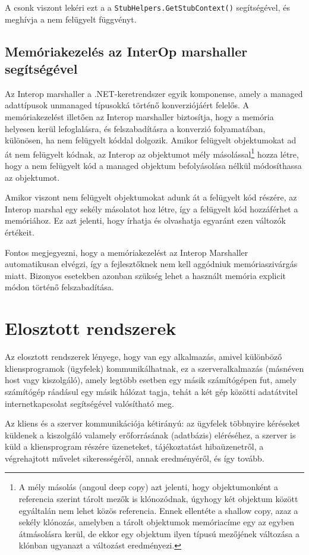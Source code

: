\documentclass[tocnopagenum]{thesis-ekf}
\theoremstyle{definition}
\theoremstyle{remark}
\begin{document}
	A csonk viszont lekéri ezt a a \verb*|StubHelpers.GetStubContext()| segítségével, és meghívja a nem felügyelt függvényt.
	\cite{pinvoke}
	\cite{interop_native}
	\section{Memóriakezelés az InterOp marshaller segítségével}
	Az Interop marshaller a .NET-keretrendszer egyik komponense, amely a managed adattípusok unmanaged típusokká történő konverziójáért felelős. A memóriakezelést illetően az Interop marshaller biztosítja, hogy a memória helyesen kerül lefoglalásra, és felszabadításra a konverzió folyamatában, különösen, ha nem felügyelt kóddal dolgozik.
	Amikor felügyelt objektumokat ad át nem felügyelt kódnak, az Interop az objektumot mély másolással\footnote{A mély másolás (angoul deep copy) azt jelenti, hogy objektumonként a referencia szerint tárolt mezők is klónozódnak, úgyhogy két objektum között egyáltalán nem lehet közös referencia. Ennek ellentéte a shallow copy, azaz a sekély klónozás, amelyben a tárolt objektumok memóriacíme egy az egyben átmásolásra kerül, de ekkor egy objektum ilyen típusú mezőjének változása a klónban ugyanazt a változást eredményezi.} hozza létre, hogy a nem felügyelt kód a managed objektum befolyásolása nélkül módosíthassa az objektumot. 
	
	Amikor viszont nem felügyelt objektumokat adunk át a felügyelt kód részére, az Interop marshal egy sekély másolatot hoz létre, így a felügyelt kód hozzáférhet a memóriához. Ez azt jelenti, hogy írhatja és olvashatja egyaránt ezen változók értékeit.
	
	Fontos megjegyezni, hogy a memóriakezelést az Interop Marshaller automatikusan elvégzi, így a fejlesztőknek nem kell aggódniuk memóriaszivárgás miatt. Bizonyos esetekben azonban szükség lehet a használt memória explicit módon történő felszabadítása.
	\cite{memhandling}
	\chapter{Elosztott rendszerek}
	Az elosztott rendszerek lényege, hogy van egy alkalmazás, amivel különböző kliensprogramok (ügyfelek) kommunikálhatnak, ez a szerveralkalmazás (másnéven host vagy kiszolgáló), amely legtöbb esetben egy másik számítógépen fut, amely számítógép ráadásul egy másik hálózat tagja, tehát a két gép közötti adatátvitel internetkapcsolat segítségével valósítható meg. 
	
	Az kliens és a szerver kommunikációja kétirányú: az ügyfelek többnyire kéréseket küldenek a kiszolgáló valamely erőforrásának (adatbázis) eléréséhez, a szerver is küld a kliensprogram részére üzeneteket, tájékoztatást hibaüzenetről, a végrehajtott művelet sikerességéről, annak eredményéről, és így tovább. 
	
\end{document}
